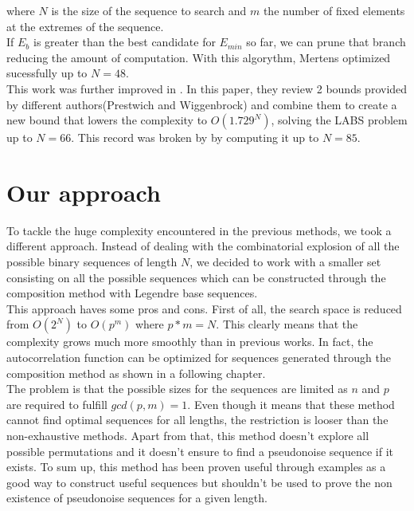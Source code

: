   where $N$ is the size of the sequence to search and $m$ the number of fixed
  elements at the extremes of the sequence.\\

  If $E_b$ is greater than the best candidate for $E_{min}$ so far, we can
  prune that branch reducing the amount of computation. With this algorythm,
  Mertens optimized sucessfully up to $N = 48$.\\

  This work was further improved in \citet{Packebusch_2016}. In this paper,
  they review 2 bounds provided by different authors(Prestwich and
  Wiggenbrock) and combine them to create a new bound that lowers the
  complexity to $O(1.729^N)$, solving the LABS problem up to $N = 66$. This
  record was broken by \citet{anatoli} by computing it up to $N = 85$.\\

  \section{Our approach}

  To tackle the huge complexity encountered in the previous methods, we took
  a different approach. Instead of dealing with the combinatorial explosion
  of all the possible binary sequences of length $N$, we decided to work with
  a smaller set consisting on all the possible sequences which can be
  constructed through the composition method with Legendre base sequences.\\

  This approach haves some pros and cons. First of all, the search space is
  reduced from $O(2^N)$ to $O(p^m)$ where $p*m = N$. This clearly means that
  the complexity grows much more smoothly than in previous works. In fact, the
  autocorrelation function can be optimized for sequences generated through the
  composition method as shown in a following chapter.\\

  The problem is that the possible sizes for the sequences are limited as $n$
  and $p$ are required to fulfill $gcd(p, m) = 1$. Even though it means that
  these method cannot find optimal sequences for all lengths, the restriction is
  looser than the non-exhaustive methods. Apart from that, this method doesn't
  explore all possible permutations and it doesn't ensure to find a pseudonoise
  sequence if it exists. To sum up, this method has been proven useful
  through examples as a good way to construct useful sequences but shouldn't
  be used to prove the non existence of pseudonoise sequences for a given
  length.\\

